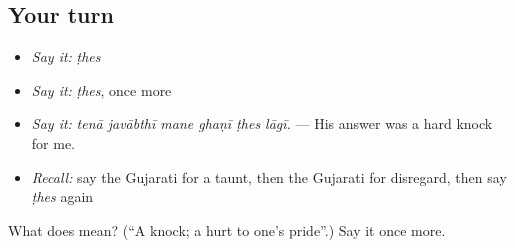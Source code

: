 \subsection*{Your turn}
\begin{itemize}
\raggedright
  \item \emph{Say it:} \emph{ṭhes}
  \item \emph{Say it:} \emph{ṭhes}, once more
  \item \emph{Say it:} \emph{tenā javābthī mane ghaṇī ṭhes lāgī.} — His answer was a hard knock for me.
  \item \emph{Recall:} say the Gujarati for a taunt, then the Gujarati for disregard, then say \emph{ṭhes} again
\end{itemize}

\begin{tcolorbox}[breakable,colback=teal!4,colframe=teal!35!black,title={Before you move on}]
What does  mean? (\textquotedblleft{}A knock; a hurt to one's pride\textquotedblright{}.) Say it once more.
\end{tcolorbox}
